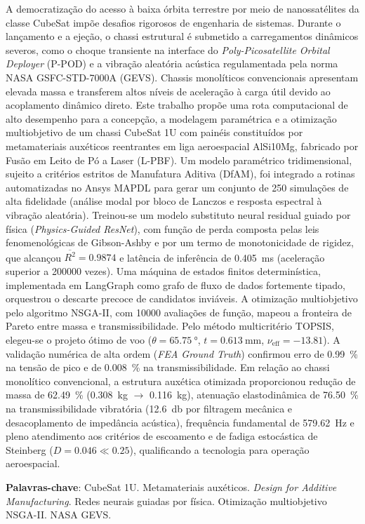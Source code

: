 \setlength{\absparsep}{18pt}
\begin{resumo}
A democratização do acesso à baixa órbita terrestre por meio de nanossatélites da classe CubeSat impõe desafios rigorosos de engenharia de sistemas. Durante o lançamento e a ejeção, o chassi estrutural é submetido a carregamentos dinâmicos severos, como o choque transiente na interface do \textit{Poly-Picosatellite Orbital Deployer} (P-POD) e a vibração aleatória acústica regulamentada pela norma NASA GSFC-STD-7000A (GEVS). Chassis monolíticos convencionais apresentam elevada massa e transferem altos níveis de aceleração à carga útil devido ao acoplamento dinâmico direto. Este trabalho propõe uma rota computacional de alto desempenho para a concepção, a modelagem paramétrica e a otimização multiobjetivo de um chassi CubeSat 1U com painéis constituídos por metamateriais auxéticos reentrantes em liga aeroespacial AlSi10Mg, fabricado por Fusão em Leito de Pó a Laser (L-PBF). Um modelo paramétrico tridimensional, sujeito a critérios estritos de Manufatura Aditiva (DfAM), foi integrado a rotinas automatizadas no Ansys MAPDL para gerar um conjunto de 250 simulações de alta fidelidade (análise modal por bloco de Lanczos e resposta espectral à vibração aleatória). Treinou-se um modelo substituto neural residual guiado por física (\textit{Physics-Guided ResNet}), com função de perda composta pelas leis fenomenológicas de Gibson-Ashby e por um termo de monotonicidade de rigidez, que alcançou $\overline{R^2} = \num{0.9874}$ e latência de inferência de \SI{0.405}{\milli\second} (aceleração superior a \num{200000} vezes). Uma máquina de estados finitos determinística, implementada em LangGraph como grafo de fluxo de dados fortemente tipado, orquestrou o descarte precoce de candidatos inviáveis. A otimização multiobjetivo pelo algoritmo NSGA-II, com \num{10000} avaliações de função, mapeou a fronteira de Pareto entre massa e transmissibilidade. Pelo método multicritério TOPSIS, elegeu-se o projeto ótimo de voo ($\theta = \SI{65.75}{\degree}$, $t = \SI{0.613}{\milli\metre}$, $\nu_{\text{eff}} = \num{-13.81}$). A validação numérica de alta ordem (\textit{FEA Ground Truth}) confirmou erro de \SI{0.99}{\percent} na tensão de pico e de \SI{0.008}{\percent} na transmissibilidade. Em relação ao chassi monolítico convencional, a estrutura auxética otimizada proporcionou redução de massa de \SI{62.49}{\percent} (\SI{0.308}{\kilo\gram} $\to$ \SI{0.116}{\kilo\gram}), atenuação elastodinâmica de \SI{76.50}{\percent} na transmissibilidade vibratória (\SI{12.6}{\decibel} por filtragem mecânica e desacoplamento de impedância acústica), frequência fundamental de \SI{579.62}{\hertz} e pleno atendimento aos critérios de escoamento e de fadiga estocástica de Steinberg ($D = \num{0.046} \ll \num{0.25}$), qualificando a tecnologia para operação aeroespacial.

\vspace{\onelineskip}
\noindent
\textbf{Palavras-chave}: CubeSat 1U. Metamateriais auxéticos. \textit{Design for Additive Manufacturing}. Redes neurais guiadas por física. Otimização multiobjetivo NSGA-II. NASA GEVS.
\end{resumo}

